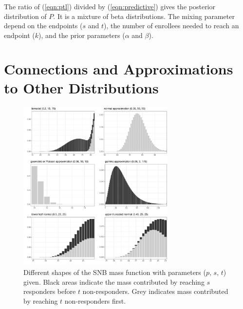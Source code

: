 \documentclass[sii]{ipart}
\begin{document}
The ratio of (\ref{eqn:ptl}) divided by (\ref{eqn:predictive}) gives the 
posterior distribution of $P$. It is a mixture of beta distributions. The
mixing parameter depend on the endpoints ($s$ and $t$), the number of enrollees needed to reach an endpoint ($k$), and the prior parameters ($\alpha$ and
$\beta$).


\section{Connections and Approximations to Other Distributions}

\begin{figure}
\centering
\includegraphics[width=0.7\textwidth]{shapes.pdf}
\caption{Different shapes of the SNB mass function with parameters 
($p$, $s$, $t$) given. Black areas indicate the mass contributed by reaching
$s$ responders before $t$ non-responders. Grey indicates
mass contributed by reaching $t$ non-responders first.}
\label{fig:shapes}
\end{figure}
\end{document}
